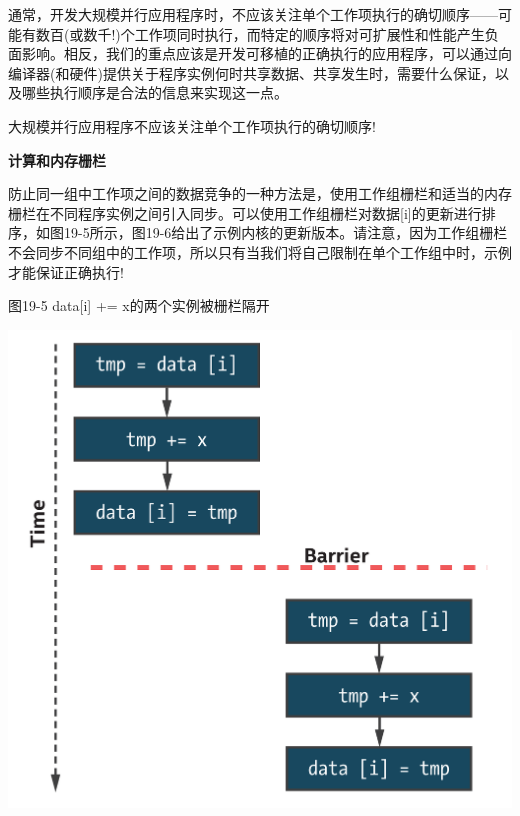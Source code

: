 通常，开发大规模并行应用程序时，不应该关注单个工作项执行的确切顺序——可能有数百(或数千!)个工作项同时执行，而特定的顺序将对可扩展性和性能产生负面影响。相反，我们的重点应该是开发可移植的正确执行的应用程序，可以通过向编译器(和硬件)提供关于程序实例何时共享数据、共享发生时，需要什么保证，以及哪些执行顺序是合法的信息来实现这一点。\par

\begin{tcolorbox}[colback=red!5!white,colframe=red!75!black]
大规模并行应用程序不应该关注单个工作项执行的确切顺序!
\end{tcolorbox}

\hspace*{\fill} \par %
\textbf{计算和内存栅栏}

防止同一组中工作项之间的数据竞争的一种方法是，使用工作组栅栏和适当的内存栅栏在不同程序实例之间引入同步。可以使用工作组栅栏对数据[i]的更新进行排序，如图19-5所示，图19-6给出了示例内核的更新版本。请注意，因为工作组栅栏不会同步不同组中的工作项，所以只有当我们将自己限制在单个工作组中时，示例才能保证正确执行!\par

\hspace*{\fill} \par %
图19-5 data[i] += x的两个实例被栅栏隔开
\begin{center}
	\includegraphics[width=1.0\textwidth]{content/chapter-19/images/4}
\end{center}

